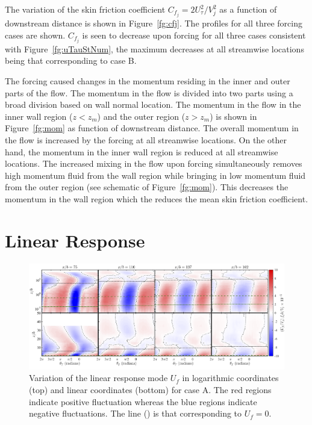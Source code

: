 The variation of the skin friction coefficient $C_{f_j} = 2U_{\tau}^2 / V_j^2$ as a function of downstream distance is shown in Figure~\ref{fg:cfj}. The profiles for all three forcing cases are shown. $C_{f_j}$ is seen to decrease upon forcing for all three cases consistent with Figure~\ref{fg:uTauStNum}, the maximum decreases at all streamwise locations being that corresponding to case B. 

The forcing caused changes in the momentum residing in the inner and outer parts of the flow. The momentum in the flow is divided into two parts using a broad division based on wall normal location. The momentum in the flow in the inner wall region ($z<z_m$) and the outer region ($z>z_m$) is shown in Figure~\ref{fg:mom} as function of downstream distance. The overall momentum in the flow is increased by the forcing at all streamwise locations. On the other hand, the momentum in the inner wall region is reduced at all streamwise locations. The increased mixing in the flow upon forcing simultaneously removes high momentum fluid from the wall region while bringing in low momentum fluid from the outer region (see schematic of Figure~\ref{fg:mom}). This decreases the momentum in the wall region which the reduces the mean skin friction coefficient.

\section{Linear Response}

\begin{figure}[h]
	\centering
	\includegraphics[width=.99\textwidth]{pics/linearResponse.png}
	\caption{Variation of the linear response mode $U_f$ in logarithmic coordinates (top) and linear coordinates (bottom) for case A. The red regions indicate positive fluctuation whereas the blue regions indicate negative fluctuations. The line (\dotted) is that corresponding to $U_f = 0$.}
	\label{fg:linResp}
\end{figure}


